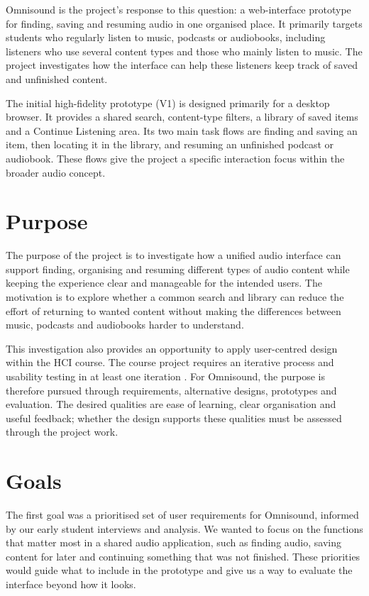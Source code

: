 Omnisound is the project's response to this question: a web-interface
prototype for finding, saving and resuming audio in one organised place. It
primarily targets students who regularly listen to music, podcasts or
audiobooks, including listeners who use several content types and those who
mainly listen to music. The project investigates how the interface can help
these listeners keep track of saved and unfinished content.

The initial high-fidelity prototype (V1) is designed primarily for a desktop
browser. It
provides a shared search, content-type filters, a library of saved items and a
Continue Listening area. Its two main task flows are finding and saving
an item, then locating it in the library, and resuming an unfinished podcast
or audiobook. These flows give the project a specific interaction focus
within the broader audio concept.

\section{Purpose}
\label{sec:purpose}

The purpose of the project is to investigate how a unified audio interface
can support finding, organising and resuming different types of audio content
while keeping the experience clear and manageable for the intended users.
The motivation is to explore whether a common search and library can reduce
the effort of returning to wanted content without making the differences
between music, podcasts and audiobooks harder to understand.

This investigation also provides an opportunity to apply user-centred design
within the HCI course. The course project requires an iterative process and
usability testing in at least one iteration \cite[pp.~2--3]{p3project}.
For Omnisound, the purpose is therefore pursued through requirements,
alternative designs, prototypes and evaluation. The desired qualities are
ease of learning, clear organisation and useful feedback; whether the design
supports these qualities must be assessed through the project work.

\section{Goals}
\label{sec:goals}

The first goal was a prioritised set of user requirements for Omnisound, informed by our early student interviews and analysis. We wanted to focus on the functions that matter most in a shared audio application, such as finding audio, saving content for later and continuing something that was not finished. These priorities would guide what to include in the prototype and give us a way to evaluate the interface beyond how it looks.

